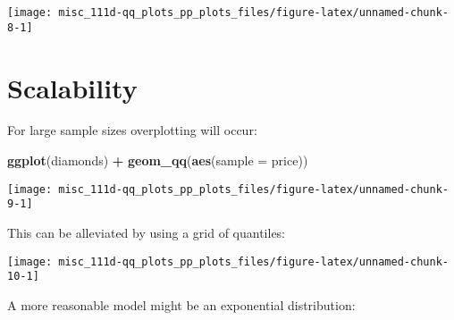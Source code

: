 \documentclass[]{book}
\newenvironment{Shaded}{\begin{snugshade}}{\end{snugshade}}
\newcommand{\DataTypeTok}[1]{\textcolor[rgb]{0.13,0.29,0.53}{#1}}
\newcommand{\DecValTok}[1]{\textcolor[rgb]{0.00,0.00,0.81}{#1}}
\newcommand{\FloatTok}[1]{\textcolor[rgb]{0.00,0.00,0.81}{#1}}
\newcommand{\KeywordTok}[1]{\textcolor[rgb]{0.13,0.29,0.53}{\textbf{#1}}}
\newcommand{\NormalTok}[1]{#1}
\newcommand{\OperatorTok}[1]{\textcolor[rgb]{0.81,0.36,0.00}{\textbf{#1}}}
\newcommand{\StringTok}[1]{\textcolor[rgb]{0.31,0.60,0.02}{#1}}
\begin{document}
\begin{center}\texttt{[image: misc\_111d-qq\_plots\_pp\_plots\_files/figure-latex/unnamed-chunk-8-1]} \end{center}

\hypertarget{scalability}{%
\section{Scalability}\label{scalability}}

For large sample sizes overplotting will occur:

\begin{Shaded}
\begin{Highlighting}[]
\KeywordTok{ggplot}\NormalTok{(diamonds) }\OperatorTok{+}\StringTok{ }\KeywordTok{geom_qq}\NormalTok{(}\KeywordTok{aes}\NormalTok{(}\DataTypeTok{sample =}\NormalTok{ price))}
\end{Highlighting}
\end{Shaded}

\begin{center}\texttt{[image: misc\_111d-qq\_plots\_pp\_plots\_files/figure-latex/unnamed-chunk-9-1]} \end{center}

This can be alleviated by using a grid of quantiles:

\begin{Shaded}
\end{Shaded}

\begin{center}\texttt{[image: misc\_111d-qq\_plots\_pp\_plots\_files/figure-latex/unnamed-chunk-10-1]} \end{center}

A more reasonable model might be an exponential distribution:

\begin{Shaded}
\end{Shaded}
\end{document}

